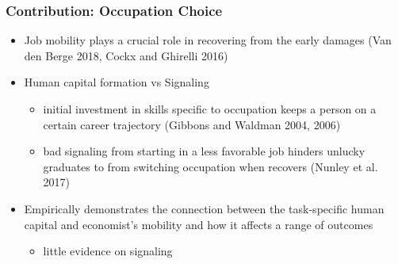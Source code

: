 \documentclass[11pt]{beamer}
\begin{document}
\begin{frame}
	\frametitle{Contribution: Occupation Choice} 
	\begin{itemize}
		\item Job mobility plays a crucial role in recovering from the early damages  (Van den Berge 2018, Cockx and Ghirelli 2016) 
		\vspace{1.6 mm}
		\item Human capital formation vs Signaling 
			\begin{itemize}
				\item initial investment in skills specific to occupation keeps a person on a certain career trajectory (Gibbons and Waldman 2004, 2006)
				\item bad signaling from starting in a less favorable job hinders unlucky graduates to from switching occupation when recovers (Nunley et al. 2017)
			\end{itemize}
		\vspace{1.6 mm}
		\item Empirically demonstrates the connection between the task-specific human capital and economist's mobility and how it affects a range of outcomes
		\begin{itemize}
			\item little evidence on signaling
		\end{itemize}		
	\end{itemize}
\end{frame}
\end{document}

